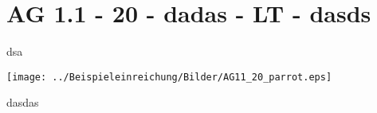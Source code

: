 \section{AG 1.1 - 20 - dadas - LT - dasds}

\begin{beispiel}[AG 1.1]{1}
dsa

\texttt{[image: ../Beispieleinreichung/Bilder/AG11\_20\_parrot.eps]}

dasdas
\end{beispiel}